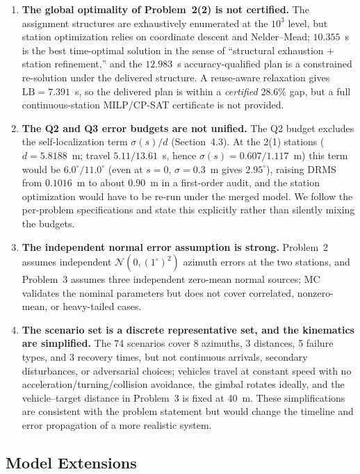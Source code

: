 \begin{enumerate}[label=(\arabic*)]
\item \textbf{The global optimality of Problem~2(2) is not certified.} The assignment structures are exhaustively enumerated at the $10^3$ level, but station optimization relies on coordinate descent and Nelder--Mead; $10.355$~s is the best time-optimal solution in the sense of ``structural exhaustion + station refinement,'' and the $12.983$~s accuracy-qualified plan is a constrained re-solution under the delivered structure. A reuse-aware relaxation gives $\mathrm{LB}=7.391$~s, so the delivered plan is within a \emph{certified} $28.6\%$ gap, but a full continuous-station MILP/CP-SAT certificate is not provided.

\item \textbf{The Q2 and Q3 error budgets are not unified.} The Q2 budget excludes the self-localization term $\sigma(s)/d$ (Section~4.3). At the 2(1) stations ($d=5.8188$~m; travel $5.11/13.61$~s, hence $\sigma(s)=0.607/1.117$~m) this term would be $6.0^\circ/11.0^\circ$ (even at $s=0$, $\sigma=0.3$~m gives $2.95^\circ$), raising DRMS from $0.1016$~m to about $0.90$~m in a first-order audit, and the station optimization would have to be re-run under the merged model. We follow the per-problem specifications and state this explicitly rather than silently mixing the budgets.

\item \textbf{The independent normal error assumption is strong.} Problem~2 assumes independent $\mathcal{N}(0,(1^\circ)^2)$ azimuth errors at the two stations, and Problem~3 assumes three independent zero-mean normal sources; MC validates the nominal parameters but does not cover correlated, nonzero-mean, or heavy-tailed cases.

\item \textbf{The scenario set is a discrete representative set, and the kinematics are simplified.} The 74 scenarios cover 8 azimuths, 3 distances, 5 failure types, and 3 recovery times, but not continuous arrivals, secondary disturbances, or adversarial choices; vehicles travel at constant speed with no acceleration/turning/collision avoidance, the gimbal rotates ideally, and the vehicle--target distance in Problem~3 is fixed at 40~m. These simplifications are consistent with the problem statement but would change the timeline and error propagation of a more realistic system.
\end{enumerate}

\subsection{Model Extensions}

